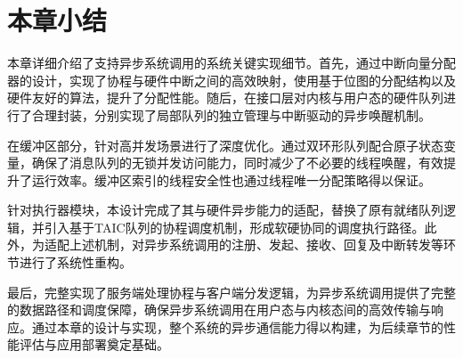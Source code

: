 \section{本章小结}

本章详细介绍了支持异步系统调用的系统关键实现细节。首先，通过中断向量分配器的设计，实现了协程与硬件中断之间的高效映射，使用基于位图的分配结构以及硬件友好的算法，提升了分配性能。随后，在接口层对内核与用户态的硬件队列进行了合理封装，分别实现了局部队列的独立管理与中断驱动的异步唤醒机制。

在缓冲区部分，针对高并发场景进行了深度优化。通过双环形队列配合原子状态变量，确保了消息队列的无锁并发访问能力，同时减少了不必要的线程唤醒，有效提升了运行效率。缓冲区索引的线程安全性也通过线程唯一分配策略得以保证。

针对执行器模块，本设计完成了其与硬件异步能力的适配，替换了原有就绪队列逻辑，并引入基于TAIC队列的协程调度机制，形成软硬协同的调度执行路径。此外，为适配上述机制，对异步系统调用的注册、发起、接收、回复及中断转发等环节进行了系统性重构。

最后，完整实现了服务端处理协程与客户端分发逻辑，为异步系统调用提供了完整的数据路径和调度保障，确保异步系统调用在用户态与内核态间的高效传输与响应。通过本章的设计与实现，整个系统的异步通信能力得以构建，为后续章节的性能评估与应用部署奠定基础。